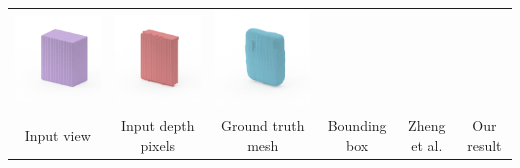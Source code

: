 \documentclass[10pt,onecolumn,letterpaper]{article}
\makeatletter
\newcommand*{\ea}{et al.\@\xspace}
\makeatother
\begin{document}
\begin{tabular}{cccccc}
\includegraphics[height=\turnheight, clip=true, trim=60 30 30 5]{spongebob_squarepants_fruit_snaks_NP2_0_bb_view_90.png} &
\includegraphics[height=\turnheight, clip=true, trim=60 30 30 5]{spongebob_squarepants_fruit_snaks_NP2_0_zheng_view_90.png} &
\includegraphics[height=\turnheight, clip=true, trim=60 30 30 5]{spongebob_squarepants_fruit_snaks_NP2_0_oma_view_90} \\
     Input view & Input depth pixels & Ground truth mesh & Bounding box &  Zheng \ea & Our result \\
\end{tabular}

\end{document}
